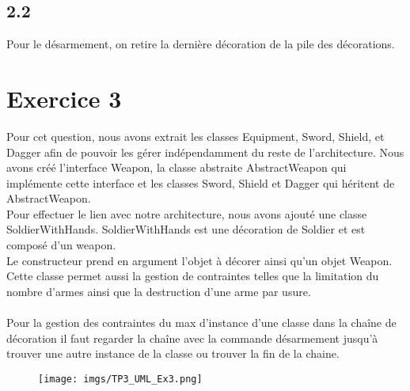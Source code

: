 \documentclass[%
a4paper,
11pt
]{article}
\begin{document}
\subsection*{2.2}
Pour le désarmement, on retire la dernière décoration de la pile des décorations.

\section*{Exercice 3}

Pour cet question, nous avons extrait les classes Equipment, Sword, Shield, et Dagger afin de pouvoir les gérer indépendamment du reste de l'architecture. Nous avons créé l'interface Weapon, la classe abstraite AbstractWeapon qui implémente cette interface et les classes Sword, Shield et Dagger qui héritent de AbstractWeapon.\\
Pour effectuer le lien avec notre architecture, nous avons ajouté une classe  SoldierWithHands. SoldierWithHands est une décoration de Soldier et est composé d'un weapon.\\

Le constructeur prend en argument l'objet à décorer ainsi qu'un objet Weapon.
Cette classe permet aussi la gestion de contraintes telles que la limitation du nombre d'armes ainsi que la destruction d'une arme par usure.\\\\
Pour la gestion des contraintes du max d'instance d'une classe dans la chaîne de décoration il faut regarder la chaîne avec la commande désarmement jusqu'à trouver une autre instance de la classe ou trouver la fin de la chaine.

\begin{figure}[!ht]
    \center
    \texttt{[image: imgs/TP3\_UML\_Ex3.png]}
\end{figure}
\end{document}
